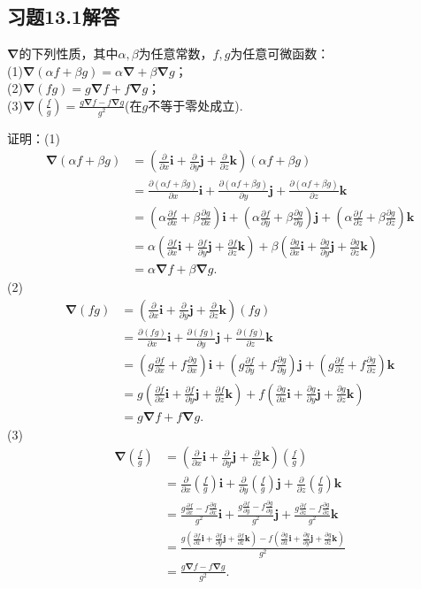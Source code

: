 \documentclass[12pt,UTF8,fleqn]{ctexart}
\newcommand{\pp}[2]{\frac{\partial #1}{\partial #2}}
\begin{document}
\subsection{习题13.1解答}
\begin{enumerate}
$\bm\nabla$的下列性质，其中$\alpha,\beta$为任意常数，$f,g$为任意可微函数：\\
(1)$\bm\nabla(\alpha f+\beta g)=\alpha\bm\nabla+\beta\bm\nabla g$；\\
(2)$\bm\nabla(fg)=g\bm\nabla f+f\bm\nabla g$；\\
(3)$\bm\nabla(\frac fg)=\frac{g\bm\nabla f-f\bm\nabla g}{g^2}$(在$g$不等于零处成立).

证明：(1)\[\begin{split}
\bm\nabla(\alpha f+\beta g)&=(\pp{}x\bm i+\pp{}y\bm j+\pp{}z\bm k)(\alpha f+\beta g)\\
&=\pp{(\alpha f+\beta g)}x\bm i+\pp{(\alpha f+\beta g)}y\bm j+\pp{(\alpha f+\beta g)}z\bm k\\
&=(\alpha\pp fx+\beta\pp gx)\bm i+(\alpha\pp fy+\beta\pp gy)\bm j+(\alpha\pp fz+\beta\pp gz)\bm k\\
&=\alpha(\pp fx\bm i+\pp fy\bm j+\pp fz\bm k)+\beta(\pp gx\bm i+\pp gy\bm j+\pp gz\bm k)\\
&=\alpha\bm\nabla f+\beta\bm\nabla g.
\end{split}\]
(2)\[\begin{split}
\bm\nabla(fg)&=(\pp{}x\bm i+\pp{}y\bm j+\pp{}z\bm k)(fg)\\
&=\pp{(fg)}x\bm i+\pp{(fg)}y\bm j+\pp{(fg)}z\bm k\\
&=(g\pp fx+f\pp gx)\bm i+(g\pp fy+f\pp gy)\bm j+(g\pp fz+f\pp gz)\bm k\\
&=g(\pp fx\bm i+\pp fy\bm j+\pp fz\bm k)+f(\pp gx\bm i+\pp gy\bm j+\pp gz\bm k)\\
&=g\bm\nabla f+f\bm\nabla g.
\end{split}\]
(3)\[\begin{split}
\bm\nabla(\frac fg)&=(\pp{}x\bm i+\pp{}y\bm j+\pp{}z\bm k)(\frac fg)\\
&=\pp{}x(\frac fg)\bm i+\pp{}y(\frac fg)\bm j+\pp{}z(\frac fg)\bm k\\
&=\frac{g\pp fx-f\pp gx}{g^2}\bm i+\frac{g\pp fy-f\pp gy}{g^2}\bm j+\frac{g\pp fz-f\pp gz}{g^2}\bm k\\
&=\frac{g(\pp fx\bm i+\pp fy\bm j+\pp fz\bm k)-f(\pp gx\bm i+\pp gy\bm j+\pp gz\bm k)}{g^2}\\
&=\frac{g\bm\nabla f-f\bm\nabla g}{g^2}.
\end{split}\]

\end{enumerate}
\end{document}
